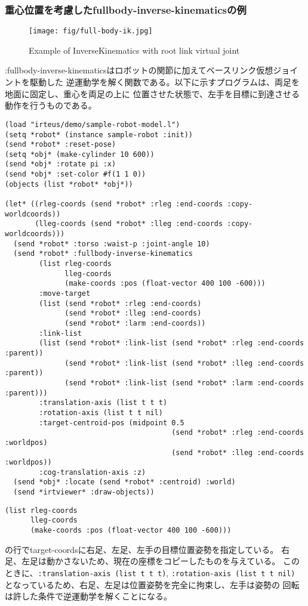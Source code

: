 \subsubsection{重心位置を考慮したfullbody-inverse-kinematicsの例}
\begin{figure}[htb]
  \begin{center}
    \texttt{[image: fig/full-body-ik.jpg]}
    \caption{Example of InverseKinematics with root link virtual joint}
  \end{center}
\end{figure}
:fullbody-inverse-kinematicsはロボットの関節に加えてベースリンク仮想ジョイントを駆動した
逆運動学を解く関数である。以下に示すプログラムは、両足を地面に固定し、重心を両足の上に
位置させた状態で、左手を目標に到達させる動作を行うものである。
{\baselineskip=10pt
\begin{verbatim}
(load "irteus/demo/sample-robot-model.l")
(setq *robot* (instance sample-robot :init))
(send *robot* :reset-pose)
(setq *obj* (make-cylinder 10 600))
(send *obj* :rotate pi :x)
(send *obj* :set-color #f(1 1 0))
(objects (list *robot* *obj*))

(let* ((rleg-coords (send *robot* :rleg :end-coords :copy-worldcoords))
       (lleg-coords (send *robot* :lleg :end-coords :copy-worldcoords)))
  (send *robot* :torso :waist-p :joint-angle 10)
  (send *robot* :fullbody-inverse-kinematics
        (list rleg-coords
              lleg-coords
              (make-coords :pos (float-vector 400 100 -600)))
        :move-target
        (list (send *robot* :rleg :end-coords)
              (send *robot* :lleg :end-coords)
              (send *robot* :larm :end-coords))
        :link-list
        (list (send *robot* :link-list (send *robot* :rleg :end-coords :parent))
              (send *robot* :link-list (send *robot* :lleg :end-coords :parent))
              (send *robot* :link-list (send *robot* :larm :end-coords :parent)))
        :translation-axis (list t t t)
        :rotation-axis (list t t nil)
        :target-centroid-pos (midpoint 0.5
                                       (send *robot* :rleg :end-coords :worldpos)
                                       (send *robot* :lleg :end-coords :worldpos))
        :cog-translation-axis :z)
  (send *obj* :locate (send *robot* :centroid) :world)
  (send *irtviewer* :draw-objects))
\end{verbatim}
}

{\baselineskip=10pt
\begin{verbatim}
(list rleg-coords
      lleg-coords
      (make-coords :pos (float-vector 400 100 -600)))
\end{verbatim}
}
の行でtarget-coordsに右足、左足、左手の目標位置姿勢を指定している。
右足、左足は動かさないため、現在の座標をコピーしたものを与えている。
このときに、\verb|:translation-axis (list t t t)|, \verb|:rotation-axis (list t t nil)|
となっているため、右足、左足は位置姿勢を完全に拘束し、左手は姿勢の
回転は許した条件で逆運動学を解くことになる。

